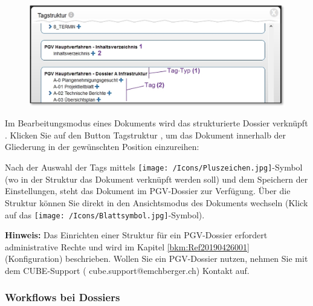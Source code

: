 \begin{figure}
  \vspace{-25pt}
  \begin{center}
    \includegraphics[width=1\linewidth]{../chapters/11_Dokumentenablage/pictures/pgv_TagAuswahl.jpg}
  \end{center}
  \vspace{-20pt}
  \vspace{-10pt}
\end{figure}
Im Bearbeitungsmodus eines Dokuments wird das strukturierte Dossier verknüpft . Klicken Sie auf den Button Tagstruktur , um das Dokument innerhalb der Gliederung in der gewünschten Position einzureihen:

\vspace{1.5cm}

Nach der Auswahl der Tags mittels \texttt{[image: /Icons/Pluszeichen.jpg]}-Symbol (wo in der Struktur das Dokument verknüpft werden soll) und dem Speichern der Einstellungen, steht das Dokument im PGV-Dossier zur Verfügung. Über die Struktur können Sie direkt in den Ansichtsmodus des Dokuments wechseln (Klick auf das  \texttt{[image: /Icons/Blattsymbol.jpg]}-Symbol).

\vspace{\baselineskip}

\textbf{Hinweis:} Das Einrichten einer Struktur für ein PGV-Dossier erfordert administrative Rechte und wird im Kapitel \ref{bkm:Ref20190426001} (Konfiguration) beschrieben. Wollen Sie ein PGV-Dossier nutzen, nehmen Sie mit dem CUBE-Support ({\color{red} cube.support@emchberger.ch}) Kontakt auf.

\subsubsection{Workflows bei Dossiers}

